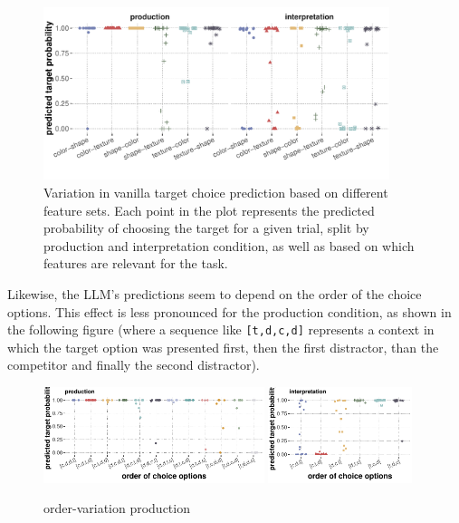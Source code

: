 \documentclass{article}
\begin{document}
\begin{figure}
  \centering
  \includegraphics[width=0.9\textwidth]{00-pics/feature-set-variation.pdf}
  \caption{
    Variation in vanilla target choice prediction based on different feature sets.
    Each point in the plot represents the predicted probability of choosing the target for a given trial, split by production and interpretation condition, as well as based on which features are relevant for the task.}
  \label{fig:feature-set-variation}
\end{figure}

\bigskip

Likewise, the LLM's predictions seem to depend on the order of the choice options.
This effect is less pronounced for the production condition, as shown in the following figure (where a sequence like \texttt{[t,d,c,d]} represents a context in which the target option was presented first, then the first distractor, than the competitor and finally the second distractor).

\begin{figure}
  \centering

  \includegraphics[width = 0.575\textwidth]{00-pics/order-variation-production.pdf}
  \hfill
  \includegraphics[width = 0.375\textwidth]{00-pics/order-variation-interpretation.pdf}

  \caption{order-variation production}
  \label{fig:order-variation-production}
\end{figure}
\end{document}

